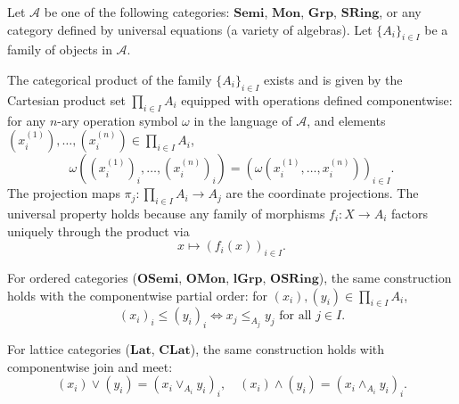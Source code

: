 \begin{proposition} \label{proposition:products_in_algebraic_categories_are_componentwise}
Let $\mathcal{A}$ be one of the following categories: $\mathbf{Semi}$, $\mathbf{Mon}$, $\mathbf{Grp}$, $\mathbf{SRing}$, or any category defined by universal equations (a variety of algebras). Let $\{A_i\}_{i \in I}$ be a family of objects in $\mathcal{A}$.

The categorical product of the family $\{A_i\}_{i \in I}$ exists and is given by the Cartesian product set $\prod_{i \in I} A_i$ equipped with operations defined componentwise: for any $n$-ary operation symbol $\omega$ in the language of $\mathcal{A}$, and elements $(x^{(1)}_i), \dots, (x^{(n)}_i) \in \prod_{i \in I} A_i$,
$$\omega((x^{(1)}_i)_i, \dots, (x^{(n)}_i)_i) = (\omega(x^{(1)}_i, \dots, x^{(n)}_i))_{i \in I}.$$
The projection maps $\pi_j : \prod_{i \in I} A_i \to A_j$ are the coordinate projections. The universal property holds because any family of morphisms $f_i : X \to A_i$ factors uniquely through the product via
$$x \mapsto (f_i(x))_{i \in I}.$$

For ordered categories ($\mathbf{OSemi}$, $\mathbf{OMon}$, $\mathbf{lGrp}$, $\mathbf{OSRing}$), the same construction holds with the componentwise partial order: for $(x_i), (y_i) \in \prod_{i \in I} A_i$,
$$(x_i)_i \leq (y_i)_i \iff x_j \leq_{A_j} y_j \text{ for all } j \in I.$$

For lattice categories ($\mathbf{Lat}$, $\mathbf{CLat}$), the same construction holds with componentwise join and meet:
$$(x_i) \vee (y_i) = (x_i \vee_{A_i} y_i)_i, \quad (x_i) \wedge (y_i) = (x_i \wedge_{A_i} y_i)_i.$$
\end{proposition}
